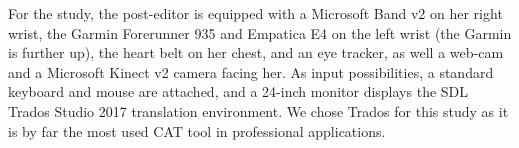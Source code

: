 \documentclass[output=paper]{langsci/langscibook}
\begin{document}


For the study, the post-editor is equipped with a Microsoft Band v2 on her right wrist, the Garmin Forerunner 935 and Empatica E4 on the left wrist (the Garmin is further up), the heart belt on her chest, and an eye tracker, as well a web-cam and a Microsoft Kinect v2 camera facing her. As input possibilities, a standard keyboard and mouse are attached, and a 24-inch monitor displays the SDL Trados Studio 2017 translation environment. We chose Trados for this study as it is by far the most used CAT tool in professional applications.
\end{document}
